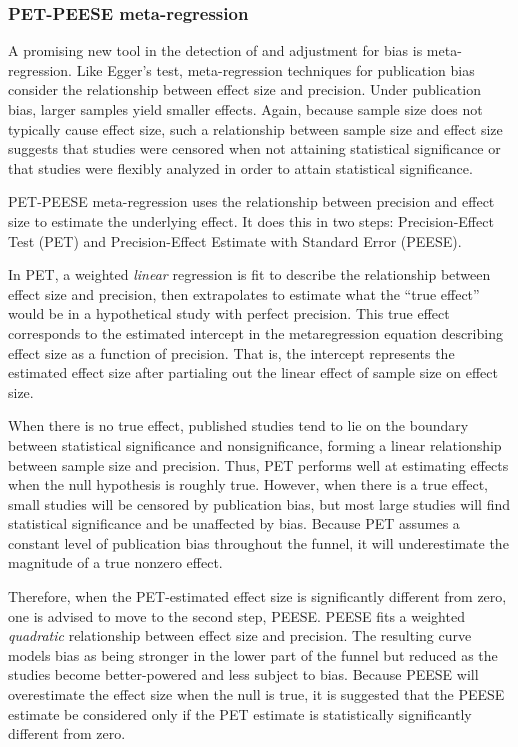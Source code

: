 \documentclass[man]{apa6}
\begin{document}
\subsubsection{PET-PEESE meta-regression}
A promising new tool in the detection of and adjustment for bias is meta-regression. Like Egger's test, meta-regression techniques for publication bias consider the relationship between effect size and precision. Under publication bias, larger samples yield smaller effects. Again, because sample size does not typically cause effect size, such a relationship between sample size and effect size suggests that studies were censored when not attaining statistical significance or that studies were flexibly analyzed in order to attain statistical significance. 

PET-PEESE meta-regression \citep{Stanley:Doucouliagos:2013} %
uses the relationship between precision and effect size to estimate the underlying effect. It does this in two steps: Precision-Effect Test (PET) and Precision-Effect Estimate with Standard Error (PEESE). 

In PET, a weighted {\em linear} regression is fit to describe the relationship between effect size and precision, then extrapolates to estimate what the ``true effect'' would be in a hypothetical study with perfect precision. This true effect corresponds to the estimated intercept in the metaregression equation describing effect size as a function of precision. That is, the intercept represents the estimated effect size after partialing out the linear effect of sample size on effect size.

When there is no true effect, published studies tend to lie on the boundary between statistical significance and nonsignificance, forming a linear relationship between sample size and precision. Thus, PET performs well at estimating effects when the null hypothesis is roughly true. However, when there is a true effect, small studies will be censored by publication bias, but most large studies will find statistical significance and be unaffected by bias. Because PET assumes a constant level of publication bias throughout the funnel, it will underestimate the magnitude of a true nonzero effect.

Therefore, when the PET-estimated effect size is significantly different from zero, one is advised to move to the second step, PEESE. PEESE fits a weighted {\em quadratic} relationship between effect size and precision. The resulting curve models bias as being stronger in the lower part of the funnel but reduced as the studies become better-powered and less subject to bias. Because PEESE will overestimate the effect size when the null is true, it is suggested that the PEESE estimate be considered only if the PET estimate is statistically significantly different from zero.
\end{document}
